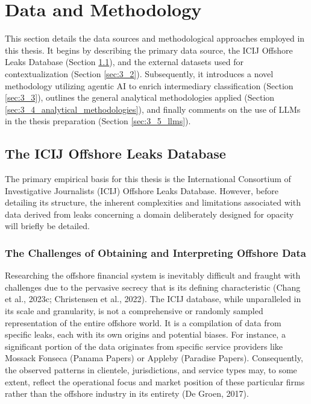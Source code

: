 \chapter{Data and Methodology}
\label{chap:data_methodology}

This section details the data sources and methodological approaches employed in this thesis. It begins by describing the primary data source, the ICIJ Offshore Leaks Database (Section \ref{sec:3_1}), and the external datasets used for contextualization (Section \ref{sec:3_2}). Subsequently, it introduces a novel methodology utilizing agentic AI to enrich intermediary classification (Section \ref{sec:3_3}), outlines the general analytical methodologies applied (Section \ref{sec:3_4_analytical_methodologies}), and finally comments on the use of LLMs in the thesis preparation (Section \ref{sec:3_5_llms}).

\section{The ICIJ Offshore Leaks Database}
\label{sec:3_1}

The primary empirical basis for this thesis is the International Consortium of Investigative Journalists (ICIJ) Offshore Leaks Database. However, before detailing its structure, the inherent complexities and limitations associated with data derived from leaks concerning a domain deliberately designed for opacity will briefly be detailed.

\subsection{The Challenges of Obtaining and Interpreting Offshore Data}
\label{sec:data_challenges}

Researching the offshore financial system is inevitably difficult and fraught with challenges due to the pervasive secrecy that is its defining characteristic (Chang et al., 2023c; Christensen et al., 2022). The ICIJ database, while unparalleled in its scale and granularity, is not a comprehensive or randomly sampled representation of the entire offshore world. It is a compilation of data from specific leaks, each with its own origins and potential biases. For instance, a significant portion of the data originates from specific service providers like Mossack Fonseca (Panama Papers) or Appleby (Paradise Papers). Consequently, the observed patterns in clientele, jurisdictions, and service types may, to some extent, reflect the operational focus and market position of these particular firms rather than the offshore industry in its entirety (De Groen, 2017).

